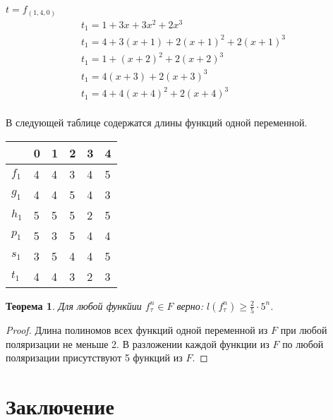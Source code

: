 \documentclass[bibliography=totoc, a4paper, 14pt]{extarticle}
\let\stdsection\section
\renewcommand\section{\newpage\stdsection}
\newtheorem{myth}{Теорема}
\begin{document}
$t=f_{(1,4,0)}$
$$
\begin{array}{l}
t_1 = 1 + 3x + 3x^2 + 2x^3 \\
t_1 = 4 + 3(x+1) + 2(x+1)^2 + 2(x+1)^3 \\
t_1 = 1 + (x+2)^2 + 2(x+2)^3 \\
t_1 = 4(x+3) + 2(x+3)^3 \\
t_1 = 4 + 4(x+4)^2 + 2(x+4)^3 \\
\end{array}
$$

В следующей таблице содержатся длины функций одной переменной.

\begin{center}
\begin{tabular}{| l | l | l | l | l | l |}
\hline
 & 0 & 1 & 2 & 3 & 4 \\
\hline
$f_{1}$ & 4 & 4 & 3 & 4 & 5 \\
\hline
$g_{1}$ & 4 & 4 & 5 & 4 & 3 \\
\hline
$h_{1}$ & 5 & 5 & 5 & 2 & 5 \\
\hline
$p_{1}$ & 5 & 3 & 5 & 4 & 4 \\
\hline
$s_{1}$ & 3 & 5 & 4 & 4 & 5 \\
\hline
$t_{1}$ & 4 & 4 & 3 & 2 & 3 \\
\hline
\end{tabular}
\end{center}

\begin{myth} Для любой функйии $f^n_{\tau} \in F$ верно:
$l(f^n_{\tau}) \geqslant \frac{2}{5}\cdot 5^n$.
\end{myth}
\begin{proof}
Длина полиномов всех функций одной переменной из $F$ при любой поляризации не меньше 2.
В разложении каждой функции из $F$ по любой поляризации присутствуют 5 функций из $F$.
\end{proof}

\section{Заключение}

\makeatletter
\renewcommand*{\@biblabel}[1]{\hfill#1.}
\makeatother
\end{document}
